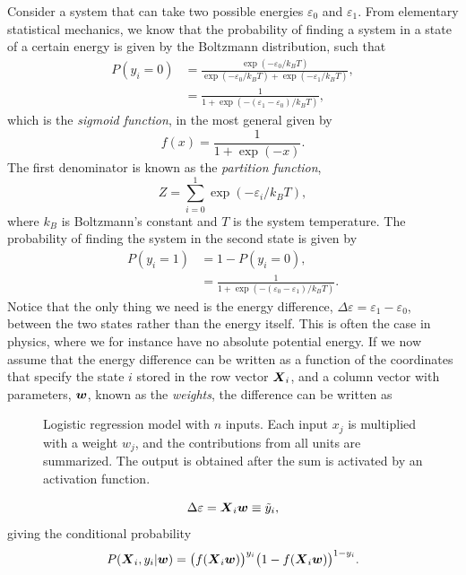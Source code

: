 Consider a system that can take two possible energies $\varepsilon_0$ and $\varepsilon_1$. From elementary statistical mechanics, we know that the probability of finding a system in a state of a certain energy is given by the Boltzmann distribution, such that
\begin{align}
P(y_i=0)&=\frac{\exp(-\varepsilon_0/k_BT)}{\exp(-\varepsilon_0/k_BT)+\exp(-\varepsilon_1/k_BT)},\\
&=\frac{1}{1+\exp(-(\varepsilon_1-\varepsilon_0)/k_BT)},
\end{align}
which is the \textit{sigmoid function}, in the most general given by
\begin{equation}
f(x)=\frac{1}{1+\exp(-x)}.
\end{equation}
The first denominator is known as the \textit{partition function},
\begin{equation}
Z=\sum_{i=0}^1\exp(-\varepsilon_i/k_BT),
\label{eq:partition}
\end{equation}
where $k_B$ is Boltzmann's constant and $T$ is the system temperature. The probability of finding the system in the second state is given by
\begin{align}
P(y_i=1)&=1-P(y_i=0),\\
&=\frac{1}{1+\exp(-(\varepsilon_0-\varepsilon_1)/k_BT)}.
\end{align}
Notice that the only thing we need is the energy difference, $\Delta\varepsilon=\varepsilon_1-\varepsilon_0$, between the two states rather than the energy itself. This is often the case in physics, where we for instance have no absolute potential energy. If we now assume that the energy difference can be written as a function of the coordinates that specify the state $i$ stored in the row vector $\boldsymbol{{X}}_i$, and a column vector with parameters, $\boldsymbol{{w}}$, known as the \textit{weights}, the difference can be written as
\begin{figure}
	\centering
	
	\caption{Logistic regression model with $n$ inputs. Each input $x_{j}$ is multiplied with a weight $w_j$, and the contributions from all units are summarized. The output is obtained after the sum is activated by an activation function.}
	\label{fig:single_perceptron}
\end{figure}
\begin{equation}
\Delta\varepsilon=\boldsymbol{{X}}_i\boldsymbol{{w}}\equiv\tilde{y}_i,
\end{equation}
giving the conditional probability
\begin{equation}
P(\boldsymbol{{X}}_i,y_i|\boldsymbol{{w}})=\big(f(\boldsymbol{{X}}_i\boldsymbol{{w}})\big)^{y_i}\big(1-f(\boldsymbol{{X}}_i\boldsymbol{{w}})\big)^{1-y_i}.
\end{equation}
